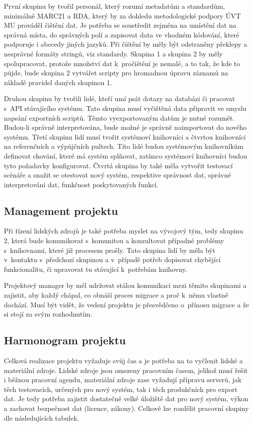 \documentclass[
	11pt, oneside, printed, final, palatino, monochrome
	microtype,
	table,   %
	lof,     %
	lot     %
]{fithesis3}
\begin{document}
{První skupinu by tvořil personál, který rozumí metadatům a standardům, minimálně MARC21 a RDA, který by za dohledu metodologické podpory ÚVT MU prováděl čištění dat. Je potřeba se soustředit zejména na umístění dat na správná místa, do správných polí a zapisovat data ve vhodném kódování, které podporuje i abecedy jiných jazyků. Při čištění by měly být odstraněny překlepy a nesprávné formáty stringů, viz standardy. Skupina 1 a skupina 2 by měly spolupracovat, protože množství dat k~pročištění je nemalé, a to tak, že kde to půjde, bude skupina 2 vytvářet scripty pro hromadnou úpravu záznamů na základě pravidel daných skupinou 1.

Druhou skupinu by tvořili lidé, kteří umí psát dotazy na databázi či pracovat s~API stávajícího systému. Tato skupina musí vyčištěná data připravit ve smyslu napsání exportních scriptů. Těmto vyexportovaným datům je nutné  rozumět. Budou-li správně interpretována, bude možné je správně naimportovat do nového systému.
Třetí skupinu lidí musí tvořit systémoví knihovníci a čtvrtou knihovníci na referenčních a výpůjčních pultech. Tito lidé budou systémovým knihovníkům definovat chování, které má systém splňovat, zatímco systémoví knihovníci budou tyto požadavky konfigurovat. Čtvrtá skupina by také měla vytvořit testovací scénáře a snažit se otestovat nový systém, respektive správnost dat, správné interpretování dat, funkčnost poskytovaných funkcí.

\subsection{Management projektu}
Při řízení lidských zdrojů je také potřeba myslet na vývojový tým, tedy skupinu 2, která bude komunikovat s~komunitou a konzultovat případné problémy s~knihovnami, které již procesem prošly. Tato skupina lidí by měla být v~kontaktu s~předchozí skupinou a v~případě potřeb dopisovat chybějící funkcionalitu, či upravovat tu stávající k~potřebám knihovny.

Projektový manager by měl udržovat stálou komunikaci mezi těmito skupinami a zajistit, aby každý chápal, co obnáší proces migrace a proč k~němu vlastně dochází. Musí být vidět, že vedení projektu je přesvědčeno o~přínosu migrace a že si stojí za svým rozhodnutím. 

\subsection{Harmonogram projektu}
Celková realizace projektu vyžaduje svůj čas a je potřeba na to vyčlenit lidské a materiální zdroje. Lidské zdroje jsou omezeny pracovním časem, jelikož musí řešit i běžnou pracovní agendu, materiální zdroje zase vyžadují přípravu serverů, jak těch testovacích, určených pro nový systém, tak i těch produkčních pro export dat. Je tedy potřeba zajistit dostatečně velké úložiště dat pro nový systém, výkon a zachovat bezpečnost dat (licence, zákony). Celkově lze rozdělit pracovní skupiny dle následujících tabulek.

}
\end{document}
